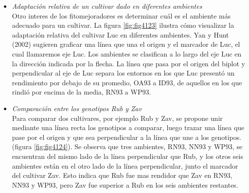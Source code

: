\begin{itemize}[wide, nosep, labelindent = 0pt, topsep = 1ex, noitemsep,topsep=0pt]
\item \emph{Adaptación relativa de un cultivar dado en diferentes ambientes}\\

Otro interes de los fitomejoradores es determinar cuál es el ambiente más adecuado para un cultivar. La figura \ref{fig:fig4123} ilustra cómo visualizar la adaptación relativa del cultivar Luc en diferentes ambientes. Yan y Hunt (2002) sugieren graficar una línea que una el origen y el marcador de Luc, el cual llamaremos eje Luc. Los ambientes se clasifican a lo largo del eje Luc en la dirección indicada por la flecha. La línea que pasa por el origen del biplot y perpendicular al eje de Luc separa los entornos en los que Luc presentó un rendimiento por debajo de su promedio, OA93 a ID93, de aquellos en los que rindió por encima de la media, RN93 a WP93.\\


\item \emph{Comparación entre los genotipos Rub y Zav}\\

Para comparar dos cultivares, por ejemplo Rub y Zav, se propone unir mediante una línea recta los genotipos a comparar, luego trazar una línea que pase por el origen y que sea perpendicular a la línea que une a los genotipos. (figura \ref{fig:fig4124}). Se observa que tres ambientes, RN93, NN93 y WP93, se encuentran del mismo lado de la línea perpendicular que Rub, y los otros seis ambientes están en el otro lado de la línea perpendicular, junto el marcador del cultivar Zav. Esto indica que Rub fue mas rendidor que Zav en RN93, NN93 y WP93, pero Zav fue superior a Rub en los seis ambientes restantes. \\



\end{itemize}
